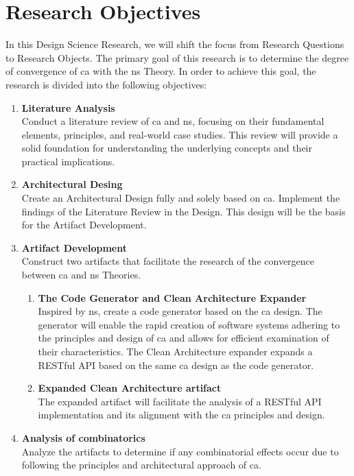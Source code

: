 \section{Research Objectives} \label{sec_research_objectives}

In this Design Science Research, we will shift the focus from Research Questions to
Research Objects. The primary goal of this research is to determine the degree of
convergence of \gls{ca} with the \gls{ns} Theory. In order to achieve this goal, the
research is divided into the following objectives:

\begin{enumerate}
    \item \textbf{Literature Analysis} \\
    Conduct a literature review of \gls{ca} and \gls{ns}, focusing on their
    fundamental elements, principles, and real-world case studies. This review will
    provide a solid foundation for understanding the underlying concepts and their
    practical implications.
    
    \item \textbf{Architectural Desing} \\
    Create an Architectural Design fully and solely based on \gls{ca}. Implement the
    findings of the Literature Review in the Design. This design will be the basis for
    the Artifact Development.

    \item \textbf{Artifact Development} \\
    Construct two artifacts that facilitate the research of the convergence
    between \gls{ca} and \gls{ns} Theories.
    \begin{enumerate}[label*={\arabic*.}]
        
        \item \textbf{The Code Generator and Clean Architecture Expander} \\
        Inspired by \gls{ns}, create a code generator based on the \gls{ca} design. The
        generator will enable the rapid creation of software systems adhering to the
        principles and design of \gls{ca} and allows for efficient examination of their
        characteristics. The Clean Architecture expander expands a RESTful API based on
        the same \gls{ca} design as the code generator. 
        
        \item \textbf{Expanded Clean Architecture artifact} \\
        The expanded artifact will facilitate the analysis of a RESTful API implementation
        and its alignment with the \gls{ca} principles and design.
        
    \end{enumerate}
    
    \item \textbf{Analysis of combinatorics} \\
    Analyze the artifacts to determine if any combinatorial effects occur due to following
    the principles and architectural approach of \gls{ca}.
\end{enumerate}